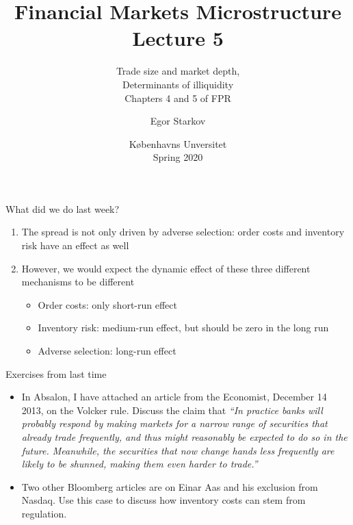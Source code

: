 \documentclass[english,10pt]{beamer}
\title{Financial Markets Microstructure \\ Lecture 5}
\subtitle{Trade size and market depth, \\ Determinants of illiquidity\\
	Chapters 4 and 5 of FPR}
\author{Egor Starkov}
\date{K{\o}benhavns Unversitet \\
	Spring 2020}
\begin{document}
	

\frame[plain]{\titlepage}


\begin{frame}{What did we do last week?}
	\begin{enumerate}
		\item The spread is not only driven by adverse selection: order costs and inventory risk have an effect as well
		\item However, we would expect the dynamic effect of these three different mechanisms to be different
		\begin{itemize}
			\item Order costs: only short-run effect 
			\item Inventory risk: medium-run effect, but should be zero in the long run
			\item Adverse selection: long-run effect 
		\end{itemize}
	\end{enumerate}
\end{frame}


\begin{frame}{Exercises from last time}
	\begin{itemize}
		\item In Absalon, I have attached an article from the Economist, December 14 2013, on the Volcker rule. Discuss the claim that \emph{``In practice banks will probably respond by making markets for a narrow range of securities that already trade frequently, and thus might reasonably be expected to do so in the future. Meanwhile, the securities that now change hands less frequently are likely to be shunned, making them even harder to trade.''}
		\item Two other Bloomberg articles are on Einar Aas and his exclusion from Nasdaq. Use this case to discuss how inventory costs can stem from regulation.
	\end{itemize}
\end{frame}
\end{document}
